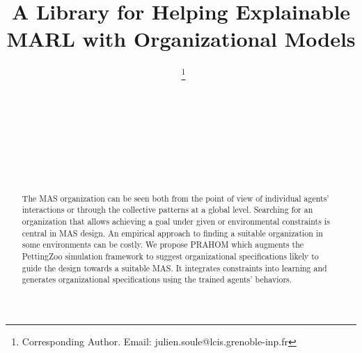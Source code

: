 \documentclass{ecai}
\begin{document}

\begin{frontmatter}




    \title{A Library for Helping Explainable MARL with Organizational Models}



    \author[A,B]{~\thanks{Corresponding Author. Email: julien.soule@lcis.grenoble-inp.fr}}
    \author[A]{~}
    \author[A]{~}
    \author[B]{~}
    \author[C]{~}

    \address[A]{Univ. Grenoble Alpes, Grenoble INP, LCIS, 26000, Valence, France}
    \address[B]{Thales Land and Air Systems, BL IAS, Rennes, France}
    \address[C]{AICA IWG, La Guillermie, France}


    \begin{abstract}
        The MAS organization can be seen both from the point of view of individual agents' interactions or through the collective patterns at a global level. Searching for an organization that allows achieving a goal under given or environmental constraints is central in MAS design.
        An empirical approach to finding a suitable organization in some environments can be costly.
        We propose PRAHOM which augments the PettingZoo simulation framework to suggest organizational specifications likely to guide the design towards a suitable MAS.
        It integrates constraints into learning and generates organizational specifications using the trained agents' behaviors.
    \end{abstract}

\end{frontmatter}
\end{document}
